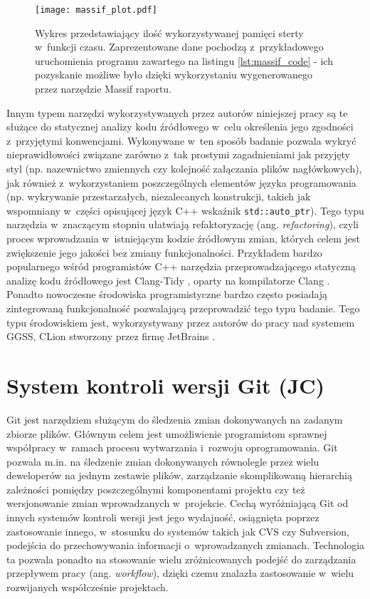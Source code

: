 \begin{figure}[H]
\centering
\texttt{[image: massif\_plot.pdf]}
\caption{Wykres przedstawiający ilość wykorzystywanej pamięci sterty w~funkcji czasu. Zaprezentowane dane pochodzą z~przykładowego uruchomienia programu zawartego na listingu \ref{lst:massif_code} - ich pozyskanie możliwe było dzięki wykorzystaniu wygenerowanego przez narzędzie Massif raportu.}
\label{fig:massif_plot}
\end{figure}

Innym typem narzędzi wykorzystywanych przez autorów niniejszej pracy są te służące do statycznej analizy kodu źródłowego w~celu określenia jego zgodności z~przyjętymi konwencjami. Wykonywane w~ten sposób badanie pozwala wykryć nieprawidłowości związane zarówno z~tak prostymi zagadnieniami jak przyjęty styl (np. nazewnictwo zmiennych czy kolejność załączania plików nagłówkowych), jak również z~wykorzystaniem poszczególnych elementów języka programowania (np. wykrywanie przestarzałych, niezalecanych konstrukcji, takich jak wspomniany w~części opisującej język C++ wskaźnik \lstinline{std::auto_ptr}). Tego typu narzędzia w~znaczącym stopniu ułatwiają refaktoryzację (ang. \emph{refactoring}), czyli proces wprowadzania w~istniejącym kodzie źródłowym zmian, których celem jest zwiększenie jego jakości bez zmiany funkcjonalności. Przykładem bardzo popularnego wśród programistów C++ narzędzia przeprowadzającego statyczną analizę kodu źródłowego jest Clang-Tidy \cite{clang-tidy}, oparty na kompilatorze Clang \cite{clang}. Ponadto nowoczesne środowiska programistyczne bardzo często posiadają zintegrowaną funkcjonalność pozwalającą przeprowadzić tego typu badanie. Tego typu środowiskiem jest, wykorzystywany przez autorów do pracy nad systemem GGSS, CLion stworzony przez firmę JetBrains \cite{clion}.


\section{System kontroli wersji Git (JC)}
Git \cite{progit} jest narzędziem służącym do śledzenia zmian dokonywanych na zadanym zbiorze plików. Głównym celem jest umożliwienie programistom sprawnej współpracy w~ramach procesu wytwarzania i~rozwoju oprogramowania. Git pozwala m.in. na śledzenie zmian dokonywanych równolegle przez wielu deweloperów na jednym zestawie plików, zarządzanie skomplikowaną hierarchią zależności pomiędzy poszczególnymi komponentami projektu czy też wersjonowanie zmian wprowadzanych w~projekcie. Cechą wyróżniającą Git od innych systemów kontroli wersji jest jego wydajność, osiągnięta poprzez zastosowanie innego, w~stosunku do systemów takich jak CVS czy Subversion, podejścia do przechowywania informacji o~wprowadzanych zmianach. Technologia ta pozwala ponadto na stosowanie wielu zróżnicowanych podejść do zarządzania przepływem pracy (ang. \emph{workflow}), dzięki czemu znalazła zastosowanie w~wielu rozwijanych współcześnie projektach.

